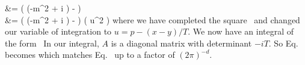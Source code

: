 {{		&= \intoi \ddT \exp(  (-m^2 + i \eps) -  ) \intnii \dddp {} \notag \\
		&= \intoi \ddT \exp(  (-m^2 + i \eps) -  ) \intnii \dddu \exp(  u^2 ) \label{thing1a3}
	}
	where we have completed the square~\cite[p.~282]{Peskin} and changed our variable of integration to $u = p - (x - y) / T$.  We now have an integral of the form~\cite{QFT}
	In our integral, $A$ is a diagonal matrix with determinant $-i T$.  So Eq.~ becomes
	which matches Eq.~ up to a factor of $(2\pi)^{-d}$.
}


\clearpage
{}

